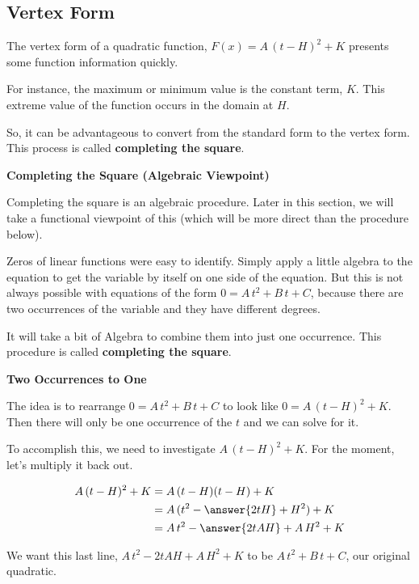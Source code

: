 \documentclass{ximera}
\begin{document}
\subsection*{Vertex Form}







The vertex form of a quadratic function, $F(x) = A \, (t-H)^2 + K$ presents some function information quickly.


For instance, the maximum or minimum value is the constant term, $K$.  This extreme value of the function occurs in the domain at $H$. 


So, it can be advantageous to convert from the standard form to the vertex form.  This process is called \textbf{completing the square}. 




\textbf{\textcolor{blue!55!black}{Completing the Square (Algebraic Viewpoint)}} 

Completing the square is an algebraic procedure.  Later in this section, we will take a functional viewpoint of this (which will be more direct than the procedure below). 



Zeros of linear functions were easy to identify.  Simply apply a little algebra to the equation to get the variable by itself on one side of the equation.  But this is not always possible with equations of the form $0 = A \, t^2 + B \, t + C $, because there are two occurrences of the variable and they have different degrees. 


It will take a bit of Algebra to combine them into just one occurrence. This procedure is called \textbf{completing the square}. 



\begin{idea} \textbf{\textcolor{blue!55!black}{Two Occurrences to One}} 


The idea is to rearrange  $0 = A \, t^2 + B \, t + C$ to look like $0 = A \, (t-H)^2 + K$.  Then there will only be  one occurrence of the $t$ and we can solve for it.


To accomplish this, we need to investigate $A \, (t-H)^2 + K$. For the moment, let's multiply it back out.


\begin{align*}
A \, (t-H)^2 + K & = A \, (t-H)(t-H) + K \\
& = A \, (t^2 - \answer{2 t H} + H^2) + K  \\
& = A \, t^2 - \answer{2 t A H} + A \, H^2 + K
\end{align*}

We want this last line, $A \, t^2 - 2 t A H + A \, H^2 + K$ to be $A \, t^2 + B \, t + C$, our original quadratic.

\end{idea}
\end{document}
